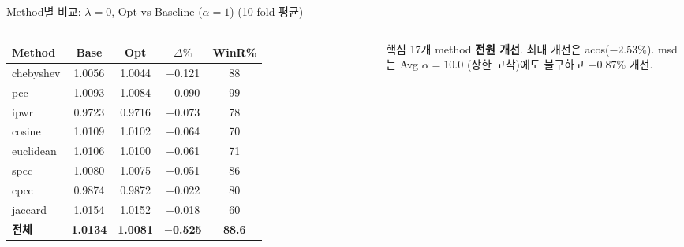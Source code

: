 \documentclass[aspectratio=169,10pt]{beamer}
\begin{document}
\begin{frame}[shrink=8]{Method별 비교: $\lambda=0$, Opt vs Baseline ($\alpha=1$) \textnormal{\small(10-fold 평균)}}
\begin{columns}[T]
			\renewcommand{\arraystretch}{1.15}
			\small
			\begin{tabular}{l|c|c|c|c}
				\toprule
				Method & Base & Opt & $\Delta\%$ & WinR\% \\
				\midrule
				chebyshev & 1.0056 & 1.0044 & \textcolor{testgreen}{$-$0.121} & 88 \\
				pcc       & 1.0093 & 1.0084 & \textcolor{testgreen}{$-$0.090} & 99 \\
				ipwr      & 0.9723 & 0.9716 & \textcolor{testgreen}{$-$0.073} & 78 \\
				cosine    & 1.0109 & 1.0102 & \textcolor{testgreen}{$-$0.064} & 70 \\
				euclidean & 1.0106 & 1.0100 & \textcolor{testgreen}{$-$0.061} & 71 \\
				spcc      & 1.0080 & 1.0075 & \textcolor{testgreen}{$-$0.051} & 86 \\
				cpcc      & 0.9874 & 0.9872 & \textcolor{testgreen}{$-$0.022} & 80 \\
				jaccard   & 1.0154 & 1.0152 & \textcolor{testgreen}{$-$0.018} & 60 \\
				\midrule
				\textbf{전체} & \textbf{1.0134} & \textbf{1.0081} & \textbf{$-$0.525} & \textbf{88.6} \\
				\bottomrule
			\end{tabular}
			\vspace{0.3em}
			\begin{exampleblock}{\small 핵심}
				\small 17개 method \textbf{전원 개선}. 최대 개선은 acos($-2.53\%$). msd는 Avg $\alpha=10.0$ (상한 고착)에도 불구하고 $-0.87\%$ 개선.
			\end{exampleblock}
	\end{columns}
\end{frame}
\end{document}

